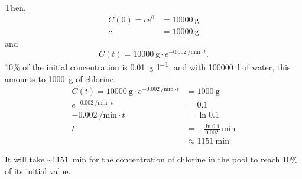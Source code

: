 \documentclass[11pt]{article}
\begin{document}
\begin{enumerate}[label=\textbf{\arabic*.}, start=2]
{            Then,
            \begin{align*}
                C(0)=ce^{0}&=\SI{10000}{\gram} \\
                c&=\SI{10000}{\gram}
            \end{align*}
            and
            \begin{equation*}
                C(t)=\SI{10000}{\gram}\cdot e^{\SI{-0.002}{\per\minute}\cdot t}.
            \end{equation*}
            10\% of the initial concentration is \SI{0.01}{\gram\per\litre}, and with \SI{100000}{\litre} of water, this amounts to \SI{1000}{\gram} of chlorine.
            \begin{align*}
                C(t)=\SI{10000}{\gram}\cdot e^{\SI{-0.002}{\per\minute}\cdot t}&=\SI{1000}{\gram} \\
                e^{\SI{-0.002}{\per\minute}\cdot t}&=0.1 \\
                \SI{-0.002}{\per\minute}\cdot t&=\ln 0.1 \\
                t&=-\frac{\ln 0.1}{0.002}\,\si{\minute} \\
                &\approx\SI{1151}{\minute}
            \end{align*}
            \begin{mdframed}
                It will take \textasciitilde{}\SI{1151}{\minute} for the concentration of chlorine in the pool to reach 10\% of its initial value.
            \end{mdframed}
        }
    \end{enumerate}
\end{document}
